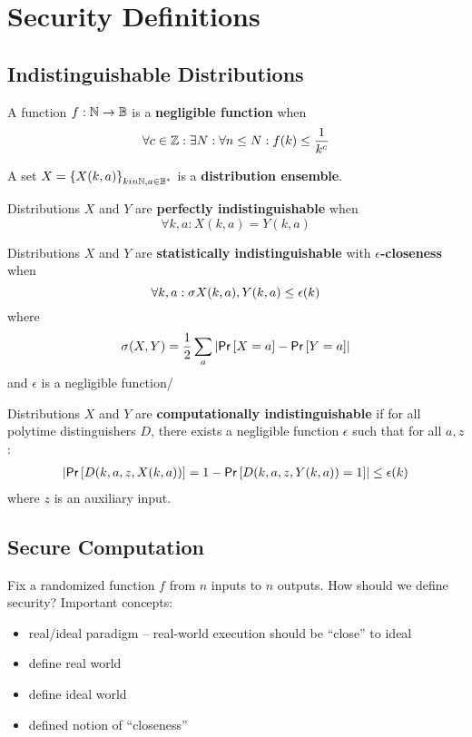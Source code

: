 \section{Security Definitions}

\subsection{Indistinguishable Distributions}

\begin{defn}
A function $f : \mathbb{N} \to \mathbb{B}$ is a \textbf{negligible function} when
\[
    \forall c \in \mathbb{Z}:
    \exists N:
    \forall n \leq N:
    f(k) \leq \frac{1}{k^c}
\]
\end{defn}

\begin{defn}
A set $X = \left\{X(k, a)\right\}_{k in \mathbb{N}, a \in \mathbb{B}^*}$ is a \textbf{distribution ensemble}.
\end{defn}

\begin{defn}
Distributions $X$ and $Y$ are \textbf{perfectly indistinguishable} when 
\[
    \forall k, a:
    X(k, a) = Y(k, a)
\]
\end{defn}

\begin{defn}
Distributions $X$ and $Y$ are \textbf{statistically indistinguishable} with \textbf{$\epsilon$-closeness} when
\[
    \forall k, a:
    \sigma{X(k, a), Y(k, a)} \leq \epsilon(k)
\]
where 
\[
    \sigma(X, Y) =
    \frac{1}{2} \sum_a \left|\mathsf{Pr}\left[X = a\right] - \mathsf{Pr}\left[Y = a\right]\right|
\]
and $\epsilon$ is a negligible function/
\end{defn}

\begin{defn}
Distributions $X$ and $Y$ are \textbf{computationally indistinguishable} if for all polytime distinguishers $D$, there exists a negligible function $\epsilon$ such that for all $a, z$:
\begin{align*}
    \left|
        \mathsf{Pr}\left[D(k, a, z, X(k, a))\right] = 1 -
        \mathsf{Pr}\left[D(k, a, z, Y(k, a)) = 1\right]
    \right|
    \leq \epsilon(k)
\end{align*}
where $z$ is an auxiliary input.
\end{defn}

\subsection{Secure Computation}

Fix a randomized function $f$ from $n$ inputs to $n$ outputs.
How should we define security?
Important concepts:
\begin{itemize}
    \item real/ideal paradigm -- real-world execution should be ``close'' to ideal
    \item define real world
    \item define ideal world
    \item defined notion of ``closeness''
\end{itemize}

